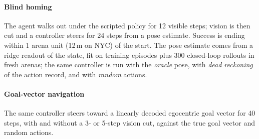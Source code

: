 \paragraph{Blind homing} The agent walks out under the scripted policy for 12 visible steps; vision is then cut and a
controller steers for 24 steps from a pose estimate. Success is ending within 1 arena unit (12\,m on NYC) of the start.
The pose estimate comes from a ridge readout of the state, fit on training episodes plus 300 closed-loop rollouts in
fresh arenas; the same controller is run with the \emph{oracle} pose, with \emph{dead reckoning} of the action record,
and with \emph{random} actions.

\paragraph{Goal-vector navigation} The same controller steers toward a linearly decoded egocentric goal vector for 40
steps, with and without a 3- or 5-step vision cut, against the true goal vector and random actions.
